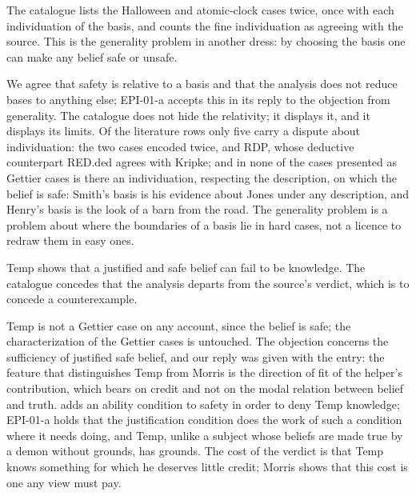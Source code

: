 \documentclass{situationist-preprint}
\begin{document}
\begin{objection}\label{o:basis}
The catalogue lists the Halloween and atomic-clock cases twice, once with each individuation of the basis, and counts the fine individuation as agreeing with the source. This is the generality problem in another dress: by choosing the basis one can make any belief safe or unsafe.
\end{objection}

\begin{reply}
We agree that safety is relative to a basis and that the analysis does not reduce bases to anything else; EPI-01-a accepts this in its reply to the objection from generality. The catalogue does not hide the relativity; it displays it, and it displays its limits. Of the \stnlit{} literature rows only five carry a dispute about individuation: the two cases encoded twice, and RDP, whose deductive counterpart RED.ded agrees with Kripke; and in none of the cases presented as Gettier cases is there an individuation, respecting the description, on which the belief is safe: Smith's basis is his evidence about Jones under any description, and Henry's basis is the look of a barn from the road. The generality problem is a problem about where the boundaries of a basis lie in hard cases, not a licence to redraw them in easy ones.
\end{reply}

\begin{objection}\label{o:sufficient}
Temp shows that a justified and safe belief can fail to be knowledge. The catalogue concedes that the analysis departs from the source's verdict, which is to concede a counterexample.
\end{objection}

\begin{reply}
Temp is not a Gettier case on any account, since the belief is safe; the characterization of the Gettier cases is untouched. The objection concerns the sufficiency of justified safe belief, and our reply was given with the entry: the feature that distinguishes Temp from Morris is the direction of fit of the helper's contribution, which bears on credit and not on the modal relation between belief and truth. \citet{Pritchard2012} adds an ability condition to safety in order to deny Temp knowledge; EPI-01-a holds that the justification condition does the work of such a condition where it needs doing, and Temp, unlike a subject whose beliefs are made true by a demon without grounds, has grounds. The cost of the verdict is that Temp knows something for which he deserves little credit; Morris shows that this cost is one any view must pay.
\end{reply}
\end{document}
